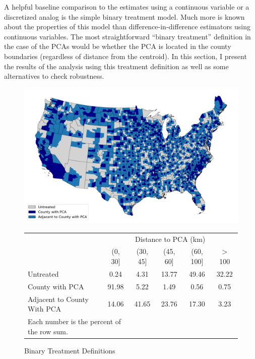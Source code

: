 \documentclass[12pt]{article}
\begin{document}
\begin{appendices}
A helpful baseline comparison to the estimates using a continuous variable or a discretized analog is the simple binary treatment model.
Much more is known about the properties of this model than difference-in-difference estimators using continuous variables.
The most straightforward ``binary treatment'' definition in the case of the PCAs would be whether the PCA is located in the county boundaries (regardless of distance from the centroid).
In this section, I present the results of the analysis using this treatment definition as well as some alternatives to check robustness.

\begin{figure}
    \caption{Binary Treatment Definitions}
    \label{binary_def}
    \includegraphics[width=\textwidth]{binary_map.png}
    \centering
    \begin{tabular}{lccccc}
         & \multicolumn{5}{c}{Distance to PCA (km)} \\
        {} &  (0, 30] &  (30, 45] &  (45, 60] &  (60, 100] &  $>$ 100 \\ \hline
        Untreated    &     0.24 &      4.31 &     13.77 &      49.46 &    32.22 \\
        County with PCA            &    91.98 &      5.22 &      1.49 &       0.56 &     0.75 \\
        Adjacent to County With PCA &    14.06 &     41.65 &     23.76 &      17.30 &     3.23 \\
        \hline \hline
        \multicolumn{2}{l}{\footnotesize{Each number is the percent of the row sum.}} 
    \end{tabular}
    
    \end{figure}
    

\end{appendices}
\end{document}
